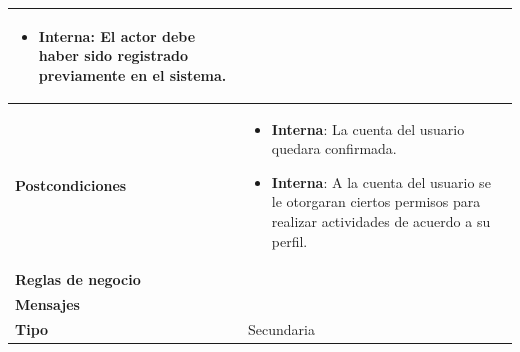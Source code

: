 \begin{center}
\begin{longtable}{| p{3.5cm} | p{11.5cm} |}
\begin{itemize}
              \item \textbf{Interna}: El actor debe haber sido registrado previamente en el sistema.
            \end{itemize} \\
        \hline	
          \textbf{Postcondiciones} & 
            \begin{itemize}
              \item \textbf{Interna}: La cuenta del usuario quedara confirmada.
              \item \textbf{Interna}: A la cuenta del usuario se le otorgaran ciertos permisos para realizar actividades de acuerdo a su perfil.
            \end{itemize} \\
        \hline
          \textbf{Reglas de negocio} & \\
        \hline
          \textbf{Mensajes} & \\
        \hline
          \textbf{Tipo} & Secundaria\\
        \hline	    
  \end{longtable}
\end{center}
\endgroup

